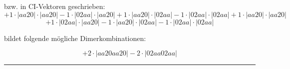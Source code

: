 \documentclass{article}
\begin{document}
\begin{minipage}{\linewidth}
bzw. in CI-Vektoren geschrieben: 
 $$+ 1 \cdot \left|aa20 \right| \cdot \left| aa20 \right| 
- 1 \cdot \left|02aa \right| \cdot \left| aa20 \right| 
+ 1 \cdot \left|aa20 \right| \cdot \left| 02aa \right| 
- 1 \cdot \left|02aa \right| \cdot \left| 02aa \right| 
+ 1 \cdot \left|aa20 \right| \cdot \left| aa20 \right| 
 $$ $$ + 1 \cdot \left|02aa \right| \cdot \left| aa20 \right| 
- 1 \cdot \left|aa20 \right| \cdot \left| 02aa \right| 
- 1 \cdot \left|02aa \right| \cdot \left| 02aa \right| 
$$



 bildet folgende mögliche Dimerkombinationen:

$$+ 2 \cdot \left|aa20aa20 \right| - 2 \cdot \left|02aa02aa \right| $$



\end{minipage}
\vspace{0.5cm}
\hrule
\vspace{0.5cm}
\end{document}
